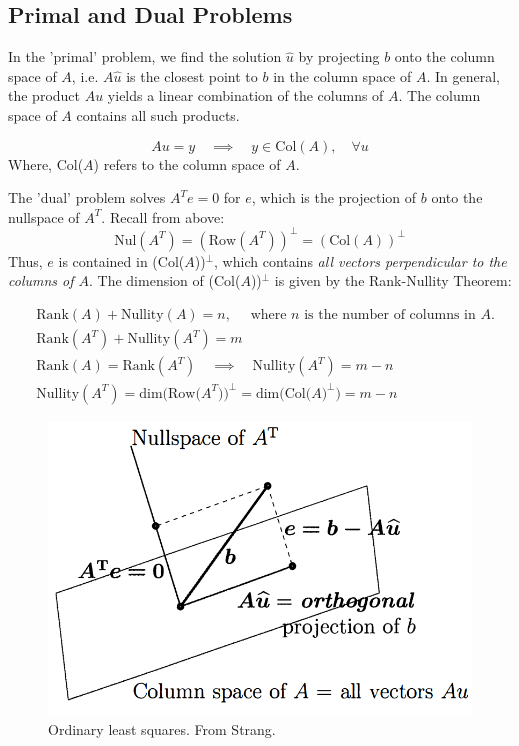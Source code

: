\documentclass[]{article}
\begin{document}
\subsection{Primal and Dual Problems}
In the 'primal' problem, we find the solution $\hat{u}$ by projecting $b$ onto the column space of $A$, i.e. $A\hat{u}$ is the closest point to $b$ in the column space of $A$. In general, the product $Au$ yields a linear combination of the columns of $A$. The column space of $A$ contains all such products. 

\begin{equation}
Au = y \quad \implies \quad y \in \textrm{Col}(A), \quad \forall u
\end{equation}
Where, Col($A$) refers to the column space of $A$. 

The 'dual' problem solves $A^T e = 0$ for $e$, which is the projection of $b$ onto the nullspace of $A^T$. Recall from above: 
$$ \textrm{Nul}(A^T) = (\textrm{Row}(A^T))^\bot = (\textrm{Col}(A))^\bot $$
Thus, $e$ is contained in (Col($A$))$^\bot$, which contains \textit{all vectors perpendicular to the columns of $A$}. The dimension of (Col($A$))$^\bot$ is given by the Rank-Nullity Theorem: 

\begin{align}
	&\textrm{Rank}(A) + \textrm{Nullity}(A) = n, \quad \textrm{ where } n \textrm{ is the number of columns in } A. \\
	&\textrm{Rank}(A^T) + \textrm{Nullity}(A^T) = m \\ 
	&\textrm{Rank}(A) = \textrm{Rank}(A^T) \quad \implies \quad \textrm{Nullity}(A^T) = m - n \\
	&\textrm{Nullity}(A^T) = \textrm{dim(Row(}A^T))^\bot = \textrm{dim(Col(}A)^\bot) = m - n
\end{align}

\begin{figure}[H]
	\centering
	\includegraphics[width=0.7\linewidth]{figs/Strang_projection_lsq}
	\caption{Ordinary least squares. From Strang.}
	\label{fig:strangprojectionlsq}
\end{figure}
\end{document}
